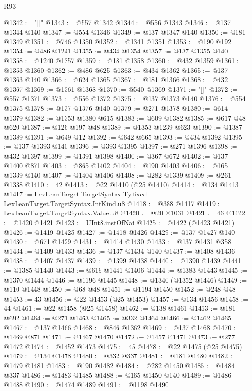 \begin{lexlean}{R93}
\begin{coremodule}
@1342 := "[["
@1343 := @557 @1342
@1344 := @556 @1343
@1346 := @137 @1344 @140
@1347 := @554 @1346
@1349 := @137 @1347 @140
@1350 := @181 @1349
@1351 := @746 @1350
@1352 := @1341 @1351
@1353 := @190 @192
@1354 := @486 @1241
@1355 := @434 @1354
@1357 := @137 @1355 @140
@1358 := @1240 @1357
@1359 := @181 @1358
@1360 := @432 @1359
@1361 := @1353 @1360
@1362 := @486 @625
@1363 := @434 @1362
@1365 := @137 @1363 @140
@1366 := @624 @1365
@1367 := @181 @1366
@1368 := @432 @1367
@1369 := @1361 @1368
@1370 := @540 @1369
@1371 := "]]"
@1372 := @557 @1371
@1373 := @556 @1372
@1375 := @137 @1373 @140
@1376 := @554 @1375
@1378 := @137 @1376 @140
@1379 := @271 @1378
@1380 := @614 @1379
@1382 := @1353 @1380 @615
@1383 := @609 @1382
@1385 := @617 @48 @620
@1387 := @126 @197 @48
@1389 := @1353 @1239 @623
@1390 := @1387 @1389
@1391 := @649 @12
@1392 := @642 @665
@1393 := @434 @1392
@1395 := @137 @1393 @140
@1396 := @393 @1395
@1397 := @271 @1396
@1398 := @432 @1397
@1399 := @1391 @1398
@1400 := @367 @672
@1402 := @137 @1400 @871
@1403 := @865 @1402
@1404 := @190 @1403
@1406 := @165 @1339 @140
@1407 := @1404 @1406
@1408 := @282 @1339
@1409 := @261 @1338
@1410 := 42
@1413 := @22 @1410 (@25 @1410)
@1414 := @134 @1413
@1417 := LexLeanTarget.TargetSyntax.Ty.fixed LexLeanTarget.TargetSyntax.IntKind.u8
@1418 := @388 @1417
@1419 := LexLeanTarget.TargetSyntax.Value.u8
@1420 := @20 @1031
@1421 := 46
@1422 := @1420 @1421
@1423 := UInt8.instOfNat
@1425 := @1422 (@1423 @1421)
@1426 := @1419 @1425
@1427 := @1418 @1426
@1429 := @137 @1427 @140
@1430 := @671 @1429
@1431 := @1414 @1430
@1433 := @137 @1431 @358
@1434 := @1409 @1433
@1436 := @137 @1434 @140
@1437 := @1408 @1436
@1438 := @1407 @1437
@1439 := @1399 @1438
@1440 := @1390 @1439
@1441 := @1385 @1440
@1443 := @619 @1441 @1406
@1444 := @1383 @1443
@1445 := @1370 @1444
@1446 := @1196 @1445
@1448 := @1340 (@1352 @1446)
@1449 := @110 @1448
@1450 := @68 @48
@1451 := @1194 @1450
@1452 := @248 @48
@1453 := 43
@1456 := @22 @1453 (@25 @1453)
@1457 := @134 @1456
@1458 := 44
@1461 := @22 @1458 (@25 @1458)
@1462 := @138 @1461
@1463 := @181 @692
@1464 := @271 @1463
@1465 := @332 @1464
@1466 := @1462 @1465
@1467 := @137 @1466
@1468 := @846 @1362
@1469 := @137 @1468
@1470 := @1469 @871
@1471 := @1467 @1470
@1472 := @1457 @1471
@1473 := @277 @1472
@1474 := @1452 @1473
@1475 := 45
@1478 := @22 @1475 (@25 @1475)
@1479 := @134 @1478
@1480 := @332 @337
@1481 := @181 @1480
@1482 := @1479 @1481
@1483 := @190 @1482
@1484 := @282 @1450
@1485 := @1484 @337
@1486 := @1483 @1485
@1488 := @165 @1450 @140
@1489 := @1486 @1488
@1490 := @1474 @1489
@1491 := @1198 @1490

\end{coremodule}
\end{lexlean}

